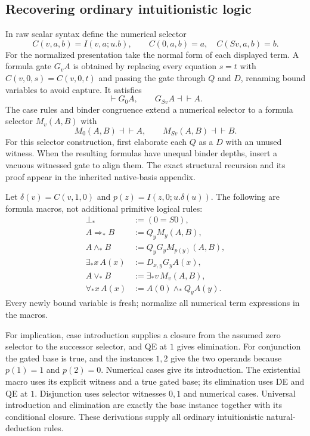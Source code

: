 \documentclass[11pt,letterpaper]{article}
\theoremstyle{definition}
\theoremstyle{remark}
\begin{document}
\subsection{Recovering ordinary intuitionistic logic}

In raw scalar syntax define the numerical selector
\[
 C(v,a,b)=I(v,a;u.b),
 \qquad C(0,a,b)=a,\quad C(Sv,a,b)=b.
\]
For the normalized presentation take the normal form of each displayed
term. A formula gate $G_v A$ is obtained by replacing every equation
$s=t$ with $C(v,0,s)=C(v,0,t)$ and passing the gate through $Q$ and $D$,
renaming bound variables to avoid capture.
It satisfies
\[
 \vdash G_0A,\qquad G_{Sv}A\dashv\vdash A.
\]
The case rules and binder congruence extend a numerical selector to a
formula selector $M_v(A,B)$ with
\[
 M_0(A,B)\dashv\vdash A,\qquad M_{Sv}(A,B)\dashv\vdash B.
\]
For this selector construction, first elaborate each $Q$ as a $D$ with
an unused witness. When the resulting formulas have unequal binder depths,
insert a vacuous witnessed gate to align them. The exact structural recursion and its
proof appear in the inherited native-basis appendix.

Let $\delta(v)=C(v,1,0)$ and $p(z)=I(z,0;u.\delta(u))$.
The following are formula macros, not additional primitive logical rules:
\begin{align*}
 \bot_* &:= (0=S0),\\
 A\Rightarrow_* B&:=Q_y M_y(A,B),\\
 A\wedge_*B&:=Q_y G_yM_{p(y)}(A,B),\\
 \exists_*x\,A(x)&:=D_{x,y}G_yA(x),\\
 A\vee_*B&:=\exists_*v\,M_v(A,B),\\
 \forall_*x\,A(x)&:=A(0)\wedge_*Q_yA(y).
\end{align*}
Every newly bound variable is fresh; normalize all numerical term
expressions in the macros.

For implication, case introduction supplies a closure from the assumed
zero selector to the successor selector, and QE at $1$ gives elimination.
For conjunction the gated base is true, and the instances $1,2$ give the
two operands because $p(1)=1$ and $p(2)=0$. Numerical cases give its
introduction. The existential macro uses its explicit witness and a true
gated base; its elimination uses DE and QE at $1$. Disjunction uses
selector witnesses $0,1$ and numerical cases. Universal introduction
and elimination are exactly the base instance together with its
conditional closure. These derivations supply all ordinary intuitionistic
natural-deduction rules.
\end{document}
